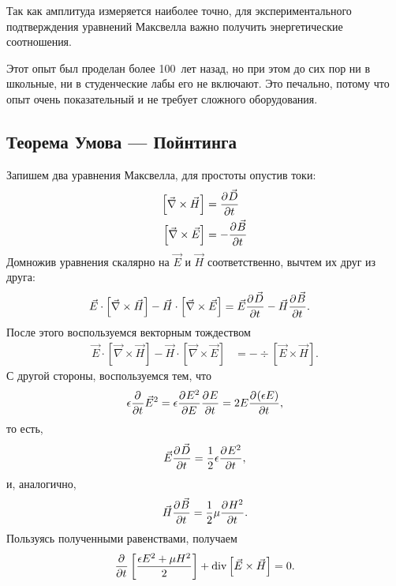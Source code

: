Так как амплитуда измеряется наиболее точно, для экспериментального
подтверждения уравнений Максвелла важно получить энергетические соотношения.

\begin{remark}
  Этот опыт был проделан более 100~лет назад, но при этом до сих пор ни
  в школьные, ни в студенческие лабы его не включают. Это печально,
  потому что опыт очень показательный и не требует сложного оборудования.
\end{remark}

\subsection{Теорема Умова --- Пойнтинга}
Запишем два уравнения Максвелла, для простоты опустив токи:
\begin{align*}
  \left[\vec{\nabla} \times \vec{H}\right] &= \frac{\partial^{} \vec{D}}{\partial t^{}} \\
  \left[\vec{\nabla} \times \vec{E}\right] &= -\frac{\partial^{} \vec{B}}{\partial t^{}}
\end{align*}
Домножив уравнения скалярно на \(\vec{E}\) и \(\vec{H}\) соответственно,
вычтем их друг из друга:
\begin{align*}
  \vec{E}\cdot\left[\vec{\nabla} \times \vec{H}\right] -
  \vec{H}\cdot\left[\vec{\nabla} \times \vec{E}\right] &= 
  \vec{E}\frac{\partial^{} \vec{D}}{\partial t^{}} - \vec{H}\frac{\partial^{} \vec{B}}{\partial t^{}}.
\end{align*}
После этого воспользуемся векторным тождеством
\begin{align*}
  \vec{E}\cdot\left[\vec{\nabla} \times \vec{H}\right]
  -
  \vec{H}\cdot\left[\vec{\nabla} \times \vec{E}\right]
  &= 
  -\div\left[\vec{E}\times\vec{H}\right].
\end{align*}
С другой стороны, воспользуемся тем, что
\begin{align*}
  \epsilon \frac{\partial^{} }{\partial t^{}}\vec{E}^2 = \epsilon \frac{\partial^{} E^2}{\partial E^{}}\frac{\partial^{} E}{\partial t^{}}
  = 2 E \frac{\partial^{} (\epsilon E)}{\partial t^{}},
\end{align*}
то есть,
\begin{align*}
  \vec{E}\frac{\partial^{} \vec{D}}{\partial t^{}} = \frac{1}{2}\epsilon\frac{\partial^{} E^2}{\partial t^{}}, 
\end{align*}
и, аналогично,
\begin{align*}
  \vec{H}\frac{\partial^{} \vec{B}}{\partial t^{}} = \frac{1}{2}\mu\frac{\partial^{} H^2}{\partial t^{}}.
\end{align*}
Пользуясь полученными равенствами, получаем
\begin{align*}
  \frac{\partial^{} }{\partial t^{}}\left[ \frac{\epsilon E^2 + \mu H^2}{2} \right]
  +\operatorname*{div}\left[\vec{E}\times\vec{H}\right] = 0.
\end{align*}
